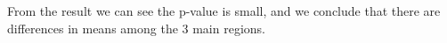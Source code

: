 \documentclass{article}
\begin{document}
\begin{enumerate}[leftmargin = 0 em, label = \arabic*., font = \bfseries]
\begin{enumerate}
\begin{enumerate}
From the result we can see the p-value is small, and we conclude that there are differences in means among the 3 main regions.


\end{enumerate}





		\end{enumerate}

	
 	\end{enumerate}









	
	
	
	
\end{document}
